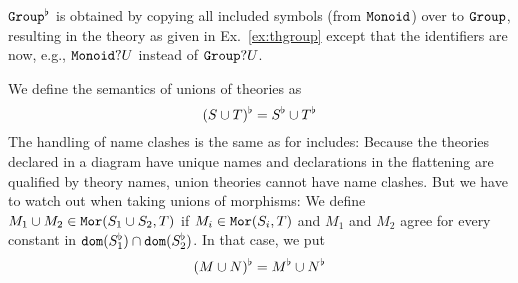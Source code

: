 \begin{example}
$\operatorname{\mathtt{Group}}^\flat$ is obtained by copying all included symbols (from $\operatorname{\mathtt{Monoid}}$) over to $\operatorname{\mathtt{Group}}$, resulting in the theory as given in Ex.~\ref{ex:thgroup} except that the identifiers are now, e.g., $\operatorname{\mathtt{Monoid}}?U$ instead of $\operatorname{\mathtt{Group}}?U$.
\end{example}

\begin{union}
\begin{example}\label{sem:union}
We define the semantics of unions of theories as
\[(S\cup T)^\flat=S^\flat\cup T^\flat\]
The handling of name clashes is the same as for includes:
Because the theories declared in a diagram have unique names and declarations in the flattening are qualified by theory names, union theories cannot have name clashes.
But we have to watch out when taking unions of morphisms:
We define $M_1\cup M_2\in \mathtt{Mor}(S_1\cup S_2,T)$ if $M_i\in\mathtt{Mor}(S_i,T)$ and $M_1$ and $M_2$ agree for every constant in $\mathtt{dom}(S_1^\flat)\cap\mathtt{dom}(S_2^\flat)$.
In that case, we put
\[(M\cup N)^\flat=M^\flat\cup N^\flat\]
\end{example}
\end{union}


